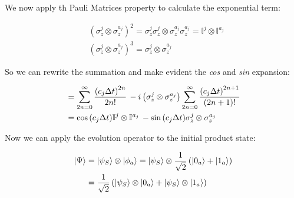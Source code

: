\documentclass[a4paper,12pt]{article}
\begin{document}
	\clearpage
	\newpage

	\begin{flushleft}
		We now apply th Pauli Matrices property to calculate the exponential term: 
	\end{flushleft}
	
	\begin{equation}
	\begin{aligned}
		&\left(\sigma_{z}^{j} \otimes \sigma_{z}^{a_j} \right)^{2} = \sigma_{z}^{j} \sigma_{z}^{j} \otimes \sigma_{z}^{a_j} \sigma_{z}^{a_j} = \mathbb{I}^{j} \otimes \mathbb{I}^{a_j} \\
		&\left(\sigma_{z}^{j} \otimes \sigma_{z}^{a_j} \right)^{3} = \sigma_{z}^{j} \otimes \sigma_{z}^{a_j}
	\end{aligned}
	\end{equation}

	\begin{flushleft}
		So we can rewrite the summation and make evident the \textit{cos} and \textit{sin} expansion:
	\end{flushleft}
	 
	\begin{align}
		&=\sum_{2n=0}^{\infty}
		{ \frac{\left( c_j \Delta t \right)^{{2n}}}{2n!} } \, - i \left(\sigma_{z}^{j} \otimes \sigma_{z}^{a_j} \right) \sum_{2n=0}^{\infty}{ \frac{\left( c_j \Delta t  \right)^{{2n+1}}}{(2n+1)!} } \notag \\	
		&= \cos{\left(c_j \Delta t\right)} \mathbb{I}^{j} \otimes \mathbb{I}^{a_j} \, - \sin{\left(c_j \Delta t \right)} \sigma_{z}^{j} \otimes \sigma_{z}^{a_j}
	\end{align}
	
	Now we can apply the evolution operator to the initial product state: 
	
	\begin{align}
		\ket{\Psi}
		&= \ket{\psi_S} \otimes \ket{\phi_a}
		= \ket{\psi_S} \otimes \frac{1}{\sqrt{2}} \left( \ket{0_a} + \ket{1_a} \right) \notag \\
		&= \frac{1}{\sqrt{2}} \left(\ket{\psi_S} \otimes  \ket{0_a} + \ket{\psi_S} \otimes  \ket{1_a} \right)
	\end{align}
	
\end{document}
